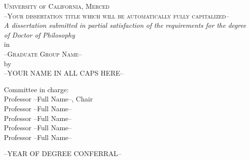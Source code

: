 \pagestyle{empty} %

\newcommand{\HRule}{\rule{\linewidth}{0.5mm}} %

\begin{center}


	
	
	\textsc{\LARGE University of California, Merced}\\[1.5cm] %
	
	\textsc{\Large --Your dissertation title which will be automatically fully capitalized--}\\[1cm] %
	
	\large \textit{A dissertation submitted in partial satisfaction of the requirements for the degree of Doctor of Philosophy}\\[1cm] %
	
    \Large in\\[1cm] 
	
	\textsc{\Large --Graduate Group Name--}\\[1cm] 
	
	\Large by\\[1cm]
	
	\textsc{\Large --YOUR NAME IN ALL CAPS HERE--}\\[1cm]
	
	\vspace{1.5in}
	\begin{minipage}{0.7\textwidth}
		\begin{flushleft}
			\large
			\hspace{-20mm}
			Committee in charge: \\
			\hspace{-10mm}
			Professor --Full Name--, Chair \\ 
			\hspace{-10mm}
			Professor --Full Name-- \\ 
			\hspace{-10mm}
			Professor --Full Name--\\
			\hspace{-10mm}
			Professor --Full Name--\\
			\hspace{-10mm}
			Professor --Full Name--\\ 
		\end{flushleft}
	\end{minipage}

    \bigskip
    \bigskip
    \bigskip
    --YEAR OF DEGREE CONFERRAL--
\end{center}